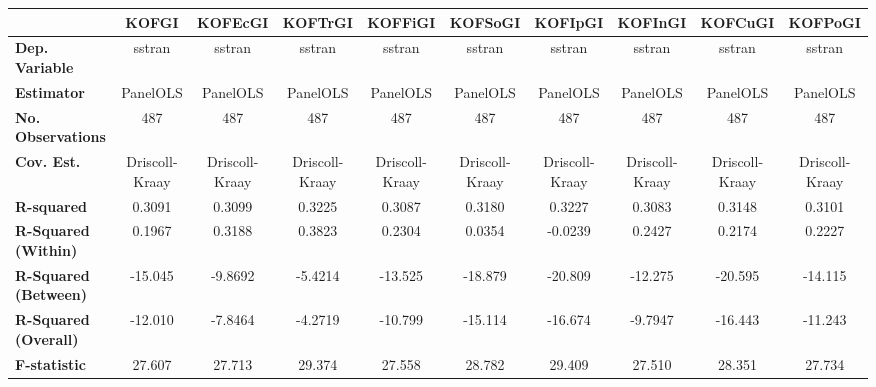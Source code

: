 \begin{center}
\begin{tabular}{lccccccccc}
\toprule
                                   &   \textbf{KOFGI}   &  \textbf{KOFEcGI}  &  \textbf{KOFTrGI}  &  \textbf{KOFFiGI}  &  \textbf{KOFSoGI}  &  \textbf{KOFIpGI}  &  \textbf{KOFInGI}  &  \textbf{KOFCuGI}  &  \textbf{KOFPoGI}   \\
\midrule
\textbf{Dep. Variable}             &       sstran       &       sstran       &       sstran       &       sstran       &       sstran       &       sstran       &       sstran       &       sstran       &       sstran        \\
\textbf{Estimator}                 &      PanelOLS      &      PanelOLS      &      PanelOLS      &      PanelOLS      &      PanelOLS      &      PanelOLS      &      PanelOLS      &      PanelOLS      &      PanelOLS       \\
\textbf{No. Observations}          &        487         &        487         &        487         &        487         &        487         &        487         &        487         &        487         &        487          \\
\textbf{Cov. Est.}                 &   Driscoll-Kraay   &   Driscoll-Kraay   &   Driscoll-Kraay   &   Driscoll-Kraay   &   Driscoll-Kraay   &   Driscoll-Kraay   &   Driscoll-Kraay   &   Driscoll-Kraay   &   Driscoll-Kraay    \\
\textbf{R-squared}                 &       0.3091       &       0.3099       &       0.3225       &       0.3087       &       0.3180       &       0.3227       &       0.3083       &       0.3148       &       0.3101        \\
\textbf{R-Squared (Within)}        &       0.1967       &       0.3188       &       0.3823       &       0.2304       &       0.0354       &      -0.0239       &       0.2427       &       0.2174       &       0.2227        \\
\textbf{R-Squared (Between)}       &      -15.045       &      -9.8692       &      -5.4214       &      -13.525       &      -18.879       &      -20.809       &      -12.275       &      -20.595       &      -14.115        \\
\textbf{R-Squared (Overall)}       &      -12.010       &      -7.8464       &      -4.2719       &      -10.799       &      -15.114       &      -16.674       &      -9.7947       &      -16.443       &      -11.243        \\
\textbf{F-statistic}               &       27.607       &       27.713       &       29.374       &       27.558       &       28.782       &       29.409       &       27.510       &       28.351       &       27.734        \\

\end{tabular}
\end{center}
